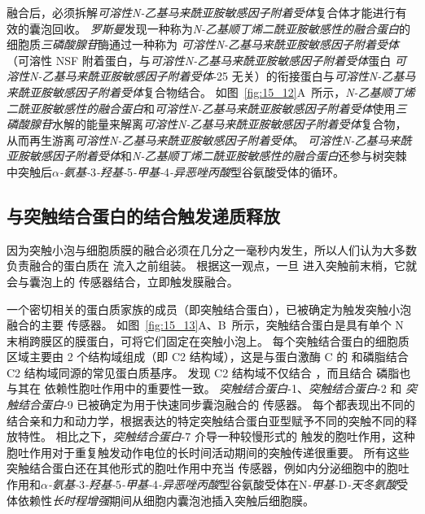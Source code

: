 融合后，必须拆解\textit{可溶性N-乙基马来酰亚胺敏感因子附着受体}复合体才能进行有效的囊泡回收。
\textit{罗斯曼}发现一种称为\textit{N-乙基顺丁烯二酰亚胺敏感性的融合蛋白}的细胞质\textit{三磷酸腺苷}酶通过一种称为 \textit{可溶性N-乙基马来酰亚胺敏感因子附着受体}（可溶性 NSF 附着蛋白，与\textit{可溶性N-乙基马来酰亚胺敏感因子附着受体}蛋白 \textit{可溶性N-乙基马来酰亚胺敏感因子附着受体}-25 无关）的衔接蛋白与\textit{可溶性N-乙基马来酰亚胺敏感因子附着受体}复合物结合。
如图~\ref{fig:15_12}A~所示，\textit{N-乙基顺丁烯二酰亚胺敏感性的融合蛋白}和\textit{可溶性N-乙基马来酰亚胺敏感因子附着受体}使用\textit{三磷酸腺苷}水解的能量来解离\textit{可溶性N-乙基马来酰亚胺敏感因子附着受体}复合物，从而再生游离\textit{可溶性N-乙基马来酰亚胺敏感因子附着受体}。
\textit{可溶性N-乙基马来酰亚胺敏感因子附着受体}和\textit{N-乙基顺丁烯二酰亚胺敏感性的融合蛋白}还参与树突棘中突触后\textit{$\alpha$-氨基-}3\textit{-羟基-}5\textit{-甲基-}4\textit{-异恶唑丙酸}型谷氨酸受体的循环。



\subsection{与突触结合蛋白的结合触发递质释放}

因为突触小泡与细胞质膜的融合必须在几分之一毫秒内发生，所以人们认为大多数负责融合的蛋白质在  流入之前组装。
根据这一观点，一旦  进入突触前末梢，它就会与囊泡上的  传感器结合，立即触发膜融合。


一个密切相关的蛋白质家族的成员（即突触结合蛋白），已被确定为触发突触小泡融合的主要  传感器。
如图~\ref{fig:15_13}A、B~所示，突触结合蛋白是具有单个 N 末梢跨膜区的膜蛋白，可将它们固定在突触小泡上。
每个突触结合蛋白的细胞质区域主要由 2 个结构域组成（即 C2 结构域），这是与蛋白激酶 C 的  和磷脂结合 C2 结构域同源的常见蛋白质基序。
发现 C2 结构域不仅结合 ，而且结合 磷脂也与其在  依赖性胞吐作用中的重要性一致。
\textit{突触结合蛋白}-1、\textit{突触结合蛋白}-2 和 \textit{突触结合蛋白}-9 已被确定为用于快速同步囊泡融合的  传感器。
每个都表现出不同的  结合亲和力和动力学，根据表达的特定突触结合蛋白亚型赋予不同的突触不同的释放特性。
相比之下，\textit{突触结合蛋白}-7 介导一种较慢形式的  触发的胞吐作用，这种胞吐作用对于重复触发动作电位的长时间活动期间的突触传递很重要。
所有这些突触结合蛋白还在其他形式的胞吐作用中充当  传感器，例如内分泌细胞中的胞吐作用和\textit{$\alpha$-氨基-}3\textit{-羟基-}5\textit{-甲基-}4\textit{-异恶唑丙酸}型谷氨酸受体在N\textit{-甲基-}D\textit{-天冬氨酸}受体依赖性\textit{长时程增强}期间从细胞内囊泡池插入突触后细胞膜。


